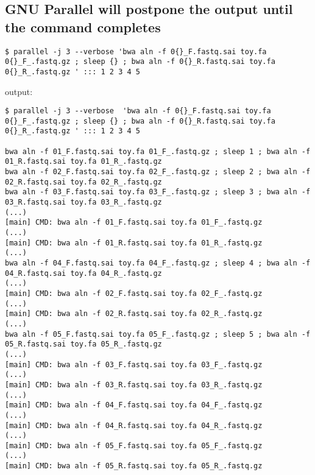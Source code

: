 \documentclass{article}
\begin{document}
\subsection{GNU Parallel will postpone the output until the command completes}
\begin{lstlisting}
$ parallel -j 3 --verbose 'bwa aln -f 0{}_F.fastq.sai toy.fa 0{}_F_.fastq.gz ; sleep {} ; bwa aln -f 0{}_R.fastq.sai toy.fa 0{}_R_.fastq.gz ' ::: 1 2 3 4 5
\end{lstlisting}
output:
\begin{lstlisting}
$ parallel -j 3 --verbose  'bwa aln -f 0{}_F.fastq.sai toy.fa 0{}_F_.fastq.gz ; sleep {} ; bwa aln -f 0{}_R.fastq.sai toy.fa 0{}_R_.fastq.gz ' ::: 1 2 3 4 5

bwa aln -f 01_F.fastq.sai toy.fa 01_F_.fastq.gz ; sleep 1 ; bwa aln -f 01_R.fastq.sai toy.fa 01_R_.fastq.gz 
bwa aln -f 02_F.fastq.sai toy.fa 02_F_.fastq.gz ; sleep 2 ; bwa aln -f 02_R.fastq.sai toy.fa 02_R_.fastq.gz 
bwa aln -f 03_F.fastq.sai toy.fa 03_F_.fastq.gz ; sleep 3 ; bwa aln -f 03_R.fastq.sai toy.fa 03_R_.fastq.gz 
(...)
[main] CMD: bwa aln -f 01_F.fastq.sai toy.fa 01_F_.fastq.gz
(...)
[main] CMD: bwa aln -f 01_R.fastq.sai toy.fa 01_R_.fastq.gz
(...)
bwa aln -f 04_F.fastq.sai toy.fa 04_F_.fastq.gz ; sleep 4 ; bwa aln -f 04_R.fastq.sai toy.fa 04_R_.fastq.gz 
(...)
[main] CMD: bwa aln -f 02_F.fastq.sai toy.fa 02_F_.fastq.gz
(...)
[main] CMD: bwa aln -f 02_R.fastq.sai toy.fa 02_R_.fastq.gz
(...)
bwa aln -f 05_F.fastq.sai toy.fa 05_F_.fastq.gz ; sleep 5 ; bwa aln -f 05_R.fastq.sai toy.fa 05_R_.fastq.gz 
(...)
[main] CMD: bwa aln -f 03_F.fastq.sai toy.fa 03_F_.fastq.gz
(...)
[main] CMD: bwa aln -f 03_R.fastq.sai toy.fa 03_R_.fastq.gz
(...)
[main] CMD: bwa aln -f 04_F.fastq.sai toy.fa 04_F_.fastq.gz
(...)
[main] CMD: bwa aln -f 04_R.fastq.sai toy.fa 04_R_.fastq.gz
(...)
[main] CMD: bwa aln -f 05_F.fastq.sai toy.fa 05_F_.fastq.gz
(...)
[main] CMD: bwa aln -f 05_R.fastq.sai toy.fa 05_R_.fastq.gz
\end{lstlisting}
\end{document}
